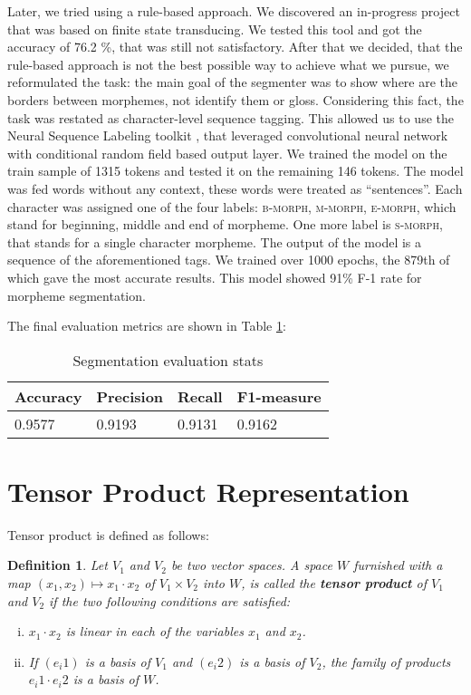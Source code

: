 \documentclass[leqno]{article}
\newtheorem{theorem}{Definition}
\begin{document}
Later, we tried using a rule-based approach. We discovered an in-progress project \parencite{chkchn} that was based on finite state transducing. We tested this tool and got the accuracy of 76.2 \%, that was still not satisfactory. After that we decided, that the rule-based approach is not the best possible way to achieve what we pursue, we reformulated the task: the main goal of the segmenter was to show where are the borders between morphemes, not identify them or gloss. Considering this fact, the task was restated as character-level sequence tagging. This allowed us to use the Neural Sequence Labeling toolkit \parencite{yang2018ncrf}, that leveraged convolutional neural network with conditional random field based output layer. We trained the model on the train sample of 1315 tokens and tested it on the remaining 146 tokens. The model was fed words without any context, these words were treated as “sentences”. Each character was assigned one of the four labels: \textsc{b-morph}, \textsc{m-morph}, \textsc{e-morph}, which stand for beginning, middle and end of morpheme. One more label is \textsc{s-morph}, that stands for a single character morpheme. The output of the model is a sequence of the aforementioned tags. We trained over 1000 epochs, the 879th of which gave the most accurate results. This model showed  91\% F-1 rate for morpheme segmentation.

The final evaluation metrics are shown in Table \ref{tab:segmmetrics}: 
\begin{table}[h]
\centering
\begin{tabular}{|l|l|l|l|}
\hline
Accuracy & Precision & Recall & F1-measure \\ \hline
0.9577   & 0.9193    & 0.9131 & 0.9162     \\ \hline
\end{tabular}
\caption{Segmentation evaluation stats}
\label{tab:segmmetrics}
\end{table}

\section{Tensor Product Representation}


Tensor product is defined as follows:

\begin{theorem}
Let $V_1$ and $V_2$ be two vector spaces.
A space $W$ furnished with a map $(x_1, x_2) \mapsto x_1 \cdot x_2$
of $V_1 \times V_2$ into $W$,
is called the \textbf{tensor product} of $V_1$ and $V_2$ if the two following conditions are satisfied:
\begin{enumerate}[i.]
    \item $x_1 \cdot x_2$ is linear in each of the variables $x_1$ and $x_2$.
    \item If $(e_i1)$ is a basis of $V_1$ and $(e_i2)$ is a basis of $V_2$, the family of products $e_i1 \cdot e_i2$ is a basis of $W$.
\end{enumerate}
\end{theorem} \parencite[p. 8]{tensorProduct}
\end{document}
